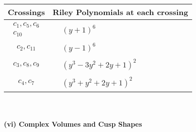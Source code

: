 \documentclass[1p]{elsarticle_modified}
\theoremstyle{definition}
\begin{document}
\begin{tabular}{m{50pt}|m{274pt}}
Crossings & \hspace{64pt}Riley Polynomials at each crossing \\
\hline $$\begin{aligned}c_{1},c_{5},c_{6}\\c_{10}\end{aligned}$$&$\begin{aligned}
&(y+1)^6
\end{aligned}$\\
\hline $$\begin{aligned}c_{2},c_{11}\end{aligned}$$&$\begin{aligned}
&(y-1)^6
\end{aligned}$\\
\hline $$\begin{aligned}c_{3},c_{8},c_{9}\end{aligned}$$&$\begin{aligned}
&(y^3-3 y^2+2 y+1)^2
\end{aligned}$\\
\hline $$\begin{aligned}c_{4},c_{7}\end{aligned}$$&$\begin{aligned}
&(y^3+y^2+2 y+1)^2
\end{aligned}$\\
\hline
\end{tabular}\\~\\
\newpage\flushleft \textbf{(vi) Complex Volumes and Cusp Shapes}
\end{document}
